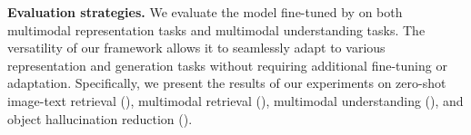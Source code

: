 \vspace{0.1cm}
\noindent\textbf{Evaluation strategies.}
We evaluate the model fine-tuned by \algname on both multimodal representation tasks and multimodal understanding tasks. 
%
The versatility of our framework allows it to seamlessly adapt to various representation and generation tasks without requiring additional fine-tuning or adaptation. 
%
Specifically, we present the results of our experiments on zero-shot image-text retrieval (), multimodal retrieval (), multimodal understanding (), and object hallucination reduction (). 
%


